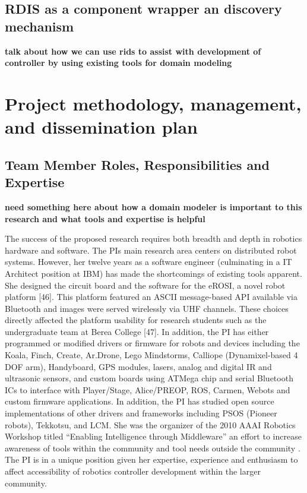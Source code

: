 \subsection{RDIS as a component wrapper an discovery mechanism}
{\bf talk about how we can use rids to assist with development of controller by using existing tools for domain modeling}


\section{Project methodology, management, and dissemination plan}
\subsection{Team Member Roles, Responsibilities and Expertise}

{\bf need something here about how a domain modeler is important to this research and what tools and expertise is helpful}

The success of the proposed research requires both breadth and depth in robotics hardware and software.  The PIs main research area centers on distributed robot systems.  However, her twelve years as a software engineer (culminating in a IT Architect position at IBM) has made the shortcomings of existing tools apparent.  She designed the circuit board and the software for the eROSI, a novel robot platform [46].  This platform featured an ASCII message-based API available via Bluetooth and images were served wirelessly via UHF channels.  These choices directly affected the platform usability for research students such as the undergraduate team at Berea College [47].  In addition, the PI has either programmed or modified drivers or firmware for robots and devices including the Koala, Finch, Create, Ar.Drone, Lego Mindstorms, Calliope (Dynamixel-based 4 DOF arm), Handyboard, GPS modules, lasers, analog and digital IR and ultrasonic sensors, and custom boards using ATMega chip and serial Bluetooth ICs to interface with Player/Stage, Alice/PREOP, ROS, Carmen, Webots and custom firmware applications.  In addition, the PI has studied open source implementations of other drivers and frameworks including PSOS (Pioneer robots), Tekkotsu, and LCM.  She was the organizer of the 2010 AAAI Robotics Workshop titled ``Enabling Intelligence through Middleware'' an effort to increase awareness of tools within the community and tool needs outside the community \cite{Croxell2008}. The PI is in a unique position given her expertise, experience and enthusiasm to affect accessibility of robotics controller development within the larger community.

